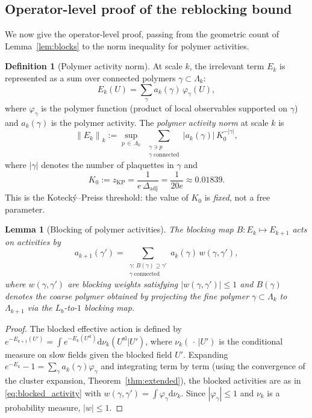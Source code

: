\documentclass[11pt,a4paper]{amsart}
\newtheorem{lemma}[theorem]{Lemma}
\theoremstyle{definition}
\newtheorem{definition}[theorem]{Definition}
\newcommand{\norm}[1]{\left\|#1\right\|}
\newcommand{\zKP}{z_{\mathrm{KP}}}
\begin{document}
\subsection{Operator-level proof of the reblocking bound}
\label{sec:reblock_op}

We now give the operator-level proof, passing from the geometric count of
Lemma~\ref{lem:blocks} to the norm inequality for polymer activities.

\begin{definition}[Polymer activity norm]
\label{def:polymer_norm}
At scale $k$, the irrelevant term $E_k$ is represented as a sum over
connected polymers $\gamma\subset\Lambda_k$:
\[
  E_k(U) = \sum_{\gamma} a_k(\gamma)\,\varphi_\gamma(U),
\]
where $\varphi_\gamma$ is the polymer function (product of local observables
supported on $\gamma$) and $a_k(\gamma)$ is the polymer activity.
The \emph{polymer activity norm} at scale $k$ is
\[
  \norm{E_k}_k := \sup_{p\,\in\,\Lambda_k}\;
  \sum_{\substack{\gamma\ni p \\ \gamma\;\text{connected}}} |a_k(\gamma)|\,K_0^{-|\gamma|},
\]
where $|\gamma|$ denotes the number of plaquettes in $\gamma$ and
\begin{equation}
\label{eq:K0def}
  K_0 := \zKP = \frac{1}{e\,\Delta_{\mathrm{adj}}} = \frac{1}{20e} \approx 0.01839.
\end{equation}
This is the Koteck\'y--Preiss threshold: the value of $K_0$ is \emph{fixed},
not a free parameter.
\end{definition}

\begin{lemma}[Blocking of polymer activities]
\label{lem:block_activities}
The blocking map $B: E_k \mapsto E_{k+1}$ acts on activities by
\begin{equation}
  a_{k+1}(\gamma') = \sum_{\substack{\gamma:\,B(\gamma)\supseteq\gamma'\\\gamma\;\text{connected}}} a_k(\gamma)\,w(\gamma,\gamma'),
\label{eq:blocked_activity}
\end{equation}
where $w(\gamma,\gamma')$ are blocking weights satisfying $|w(\gamma,\gamma')|\le 1$
and $B(\gamma)$ denotes the coarse polymer obtained by projecting the fine polymer
$\gamma\subset\Lambda_k$ to $\Lambda_{k+1}$ via the $L_b$-to-$1$ blocking map.
\end{lemma}
\begin{proof}
The blocked effective action is defined by
$e^{-E_{k+1}(U')} = \int e^{-E_k(U^{\mathrm{sl}})} \mathrm{d}\nu_k(U^{\mathrm{sl}}|U')$,
where $\nu_k(\,\cdot\,|U')$ is the conditional measure on slow fields
given the blocked field $U'$.  Expanding $e^{-E_k} - 1 = \sum_\gamma a_k(\gamma)\varphi_\gamma$
and integrating term by term (using the convergence of the cluster expansion,
Theorem~\ref{thm:extended}), the blocked activities are as in
\eqref{eq:blocked_activity} with $w(\gamma,\gamma') = \int \varphi_\gamma \mathrm{d}\nu_k$.
Since $|\varphi_\gamma| \le 1$ and $\nu_k$ is a probability measure, $|w|\le 1$.
\end{proof}
\end{document}

